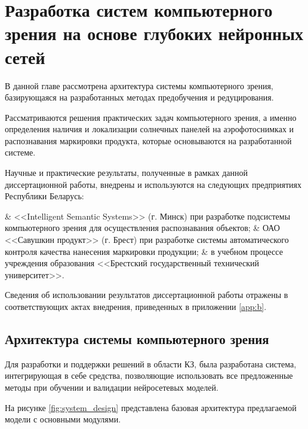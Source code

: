 \chapter{Разработка систем компьютерного зрения на основе глубоких нейронных сетей}
\label{chapter4}
В данной главе рассмотрена архитектура системы компьютерного зрения, базирующаяся на разработанных методах предобучения и редуцирования. 

Рассматриваются решения практических задач компьютерного зрения, а именно определения наличия и локализации солнечных панелей на аэрофотоснимках и распознавания маркировки продукта, которые основываются на разработанной системе.

Научные и практические результаты, полученные в рамках данной диссертационной работы, внедрены и используются на следующих предприятиях Республики Беларусь:

\begin{easylist}
	& <<Intelligent Semantic Systems>> (г. Минск) при разработке подсистемы компьютерного зрения для осуществления распознавания объектов;
	& ОАО <<Савушкин продукт>> (г. Брест) при разработке системы автоматического контроля качества нанесения маркировки продукции;
	& в учебном процессе учреждения образования <<Брестский государственный технический университет>>.
 \end{easylist}

Сведения об использовании результатов диссертационной работы отражены в соответствующих актах внедрения, приведенных в приложении \ref{app:b}.

\section{Архитектура системы компьютерного зрения}
Для разработки и поддержки решений в области КЗ, была разработана система, интегрирующая в себе средства, позволяющие использовать все предложенные методы при обучении и валидации нейросетевых моделей.

На рисунке \ref{fig:system_design} представлена базовая архитектура предлагаемой модели с основными модулями.

